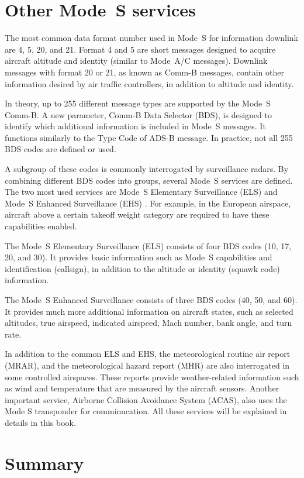 \section{Other Mode~S services}

The most common data format number used in Mode~S for information downlink are 4, 5, 20, and 21. Format 4 and 5 are short messages designed to acquire aircraft altitude and identity (similar to Mode~A/C messages). Downlink messages with format 20 or 21, as known as Comm-B messages, contain other information desired by air traffic controllers, in addition to altitude and identity.

In theory, up to 255 different message types are supported by the Mode~S Comm-B. A new parameter, Comm-B Data Selector (BDS), is designed to identify which additional information is included in Mode~S messages. It functions similarly to the Type Code of ADS-B message. In practice, not all 255 BDS codes are defined or used. 

A subgroup of these codes is commonly interrogated by surveillance radars. By combining different BDS codes into groups, several Mode~S services are defined. The two most used services are Mode~S Elementary Surveillance (ELS) and Mode~S Enhanced Surveillance (EHS) \cite{grappel2008}. For example, in the European airspace, aircraft above a certain takeoff weight category are required to have these capabilities enabled.

The Mode~S Elementary Surveillance (ELS) consists of four BDS codes (10, 17, 20, and 30). It provides basic information such as Mode~S capabilities and identification (callsign), in addition to the altitude or identity (squawk code) information. 

The Mode~S Enhanced Surveillance consists of three BDS codes (40, 50, and 60). It provides much more additional information on aircraft states, such as selected altitudes, true airspeed, indicated airspeed, Mach number, bank angle, and turn rate.

In addition to the common ELS and EHS, the meteorological routine air report (MRAR), and the meteorological hazard report (MHR) are also interrogated in some controlled airspaces. These reports provide weather-related information such as wind and temperature that are measured by the aircraft sensors. Another important service, Airborne Collision Avoidance System (ACAS), also uses the Mode S transponder for comminucation. All these services will be explained in details in this book.


\section{Summary}

